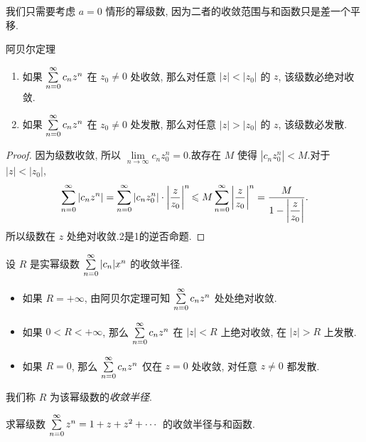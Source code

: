 我们只需要考虑 $a=0$ 情形的幂级数, 因为二者的收敛范围与和函数只是差一个平移.

\begin{main}{阿贝尔定理}
	\begin{enumerate}
		\item 如果 $\sum\limits_{n=0}^\infty c_nz^n$ 在 $z_0\neq 0$ 处收敛, 那么对任意 $|z|<|z_0|$ 的 $z$, 该级数必绝对收敛.
		\item 如果 $\sum\limits_{n=0}^\infty c_nz^n$ 在 $z_0\neq 0$ 处发散, 那么对任意 $|z|>|z_0|$ 的 $z$, 该级数必发散.
	\end{enumerate}
\end{main}

\begin{proof}
	{ 因为级数收敛, 所以 $\lim\limits_{n\to\infty}c_n z_0^n=0$.故存在 $M$ 使得 $|c_nz_0^n|<M$.对于 $|z|<|z_0|$,
		\[\sum_{n=0}^\infty|c_nz^n|=\sum_{n=0}^\infty|c_nz_0^n|\cdot\left|\frac z{z_0}\right|^n
		{\leqslant M\sum_{n=0}^\infty\left|\frac z{z_0}\right|^n
		=\frac{M}{1-\left|\dfrac z{z_0}\right|}.}\]所以级数在 $z$ 处绝对收敛.\enumnum2是\enumnum1的逆否命题.\qedhere}
\end{proof}

设 $R$ 是实幂级数 $\sum\limits_{n=0}^\infty|c_n|x^n$ 的收敛半径.
\begin{itemize}
	\item 如果 $R=+\infty$, 由阿贝尔定理可知 $\sum\limits_{n=0}^\infty c_nz^n$ 处处绝对收敛.
	\item 如果 $0<R<+\infty$, 那么 $\sum\limits_{n=0}^\infty c_nz^n$ 在 $|z|<R$ 上绝对收敛, 在 $|z|>R$ 上发散.
	\item 如果 $R=0$, 那么 $\sum\limits_{n=0}^\infty c_nz^n$ 仅在 $z=0$ 处收敛, 对任意 $z\neq 0$ 都发散.
\end{itemize}
我们称 $R$ 为该幂级数的\emph{收敛半径}.

\begin{center}
\end{center}

\begin{example}
	求幂级数 $\sum\limits_{n=0}^\infty z^n=1+z+z^2+\cdots$ 的收敛半径与和函数.
\end{example}


